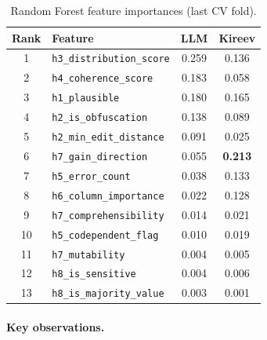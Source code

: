 \documentclass[11pt,a4paper]{article}
\newcommand{\feat}[1]{\texttt{#1}}
\begin{document}
\begin{table}[h]
\centering
\caption{Random Forest feature importances (last CV fold).}
\label{tab:importances}
\small
\begin{tabular}{@{}clcc@{}}
\toprule
\textbf{Rank} & \textbf{Feature} & \textbf{LLM} & \textbf{Kireev} \\
\midrule
1  & \feat{h3\_distribution\_score}     & 0.259 & 0.136 \\
2  & \feat{h4\_coherence\_score}        & 0.183 & 0.058 \\
3  & \feat{h1\_plausible}               & 0.180 & 0.165 \\
4  & \feat{h2\_is\_obfuscation}         & 0.138 & 0.089 \\
5  & \feat{h2\_min\_edit\_distance}     & 0.091 & 0.025 \\
6  & \feat{h7\_gain\_direction}         & 0.055 & \textbf{0.213} \\
7  & \feat{h5\_error\_count}            & 0.038 & 0.133 \\
8  & \feat{h6\_column\_importance}      & 0.022 & 0.128 \\
9  & \feat{h7\_comprehensibility}       & 0.014 & 0.021 \\
10 & \feat{h5\_codependent\_flag}       & 0.010 & 0.019 \\
11 & \feat{h7\_mutability}              & 0.004 & 0.005 \\
12 & \feat{h8\_is\_sensitive}           & 0.004 & 0.006 \\
13 & \feat{h8\_is\_majority\_value}     & 0.003 & 0.001 \\
\bottomrule
\end{tabular}
\end{table}

\paragraph{Key observations.}
\end{document}
